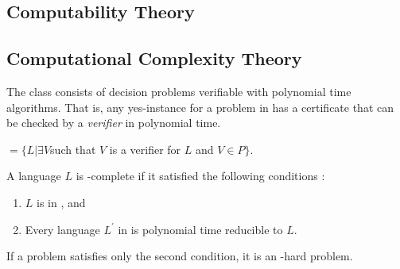 \subsection{Computability Theory} 

\subsection{Computational Complexity Theory}


The class \NP consists of decision problems verifiable with polynomial time algorithms.  That is, any
yes-instance for a problem in \NP has a certificate that can be checked by a \textit{verifier} in
polynomial time. 

\begin{defn}
\NP $= \{L | \exists V $such that $V$ is a verifier for $L$ and $V \in P\}$.
\end{defn}

\begin{defn}
A language $L$ is \NP-complete if it satisfied the following conditions :
\begin{enumerate}
    \item $L$ is in \NP, and
    \item Every language $L^{'}$ in \NP is polynomial time reducible to $L$.
\end{enumerate}
\end{defn}
If a problem satisfies only the second condition, it is an \NP-hard problem.

